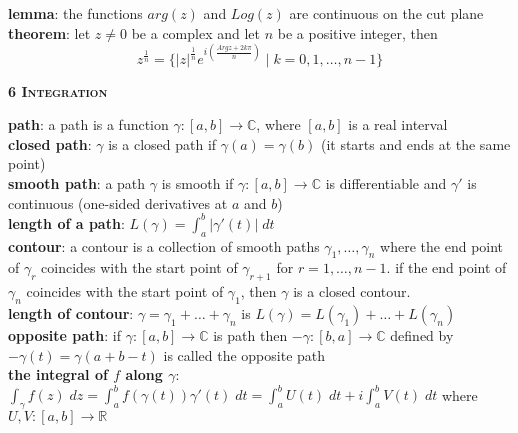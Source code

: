 \documentclass[a4paper]{article}
\newcommand*\abs[1]{\vert #1 \vert}
\begin{document}
\begin{framed}
	\noindent
	\textbf{lemma}: the functions $arg(z)$ and $Log(z)$ are continuous on the cut plane\\
	
	\noindent
	\textbf{theorem}: let $z \neq 0$ be a complex and let $n$ be a positive integer, then $$z^{\frac{1}{n}} = \{ \abs{z}^{\frac{1}{n}} e^{i (\frac{Argz + 2k\pi}{n})} \; \vert \; k = 0, 1, \dots, n - 1 \}$$
\end{framed}

\begin{framed}
	\begin{center}
		\textbf{\textsc{6 Integration}}
	\end{center}
	\textbf{path}: a path is a function $\gamma: [a, b] \rightarrow \mathbb{C}$, where $[a, b]$ is a real interval\\
	
	\noindent
	\textbf{closed path}: $\gamma$ is a closed path if $\gamma(a) = \gamma(b)$ (it starts and ends at the same point)\\
	
	\noindent
	\textbf{smooth path}: a path $\gamma$ is smooth if $\gamma: [a, b] \rightarrow \mathbb{C}$ is differentiable and $\gamma'$ is continuous (one-sided derivatives at $a$ and $b$)\\
	
	\noindent
	\textbf{length of a path}: $L(\gamma) = \int_a^b \abs{\gamma'(t)} \; dt$\\
	
	\noindent
	\textbf{contour}: a contour is a collection of smooth paths $\gamma_1, \dots, \gamma_n$ where the end point of $\gamma_r$ coincides with the start point of $\gamma_{r+1}$ for $r = 1, \dots, n - 1$. if the end point of $\gamma_n$ coincides with the start point of $\gamma_1$, then $\gamma$ is a closed contour.\\
	
	\noindent
	\textbf{length of contour}: $\gamma = \gamma_1 + \dots + \gamma_n$ is $L(\gamma) = L(\gamma_1) + \dots + L(\gamma_n)$\\
	
	\noindent
	\textbf{opposite path}: if $\gamma: [a, b] \rightarrow \mathbb{C}$ is path then $-\gamma: [b, a] \rightarrow \mathbb{C}$ defined by $-\gamma(t) = \gamma(a + b - t)$ is called the opposite path\\
	
	\noindent
	\textbf{the integral of $f$ along $\gamma$}: $\int_\gamma f(z) \; dz = \int_a^b f(\gamma(t))\gamma'(t) \; dt = \int_a^b U(t) \; dt + i \int_a^b V(t) \; dt$ where $U, V: [a, b] \rightarrow \mathbb{R}$\\
	

\end{framed}
\end{document}
